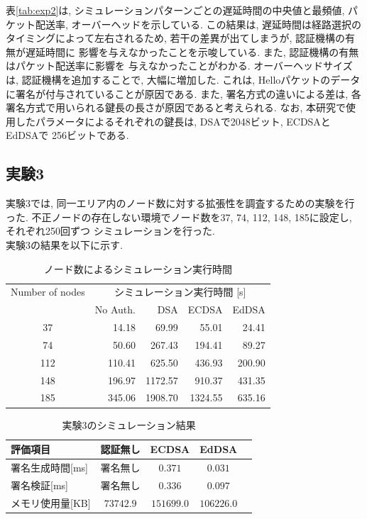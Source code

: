 \documentclass[a4j,9pt,twocolumn]{jsarticle}
\begin{document}
表\ref{tab:exp2}は, シミュレーションパターンごとの遅延時間の中央値と最頻値, 
パケット配送率, オーバーヘッドを示している. この結果は, 遅延時間は経路選択の
タイミングによって左右されるため, 若干の差異が出てしまうが, 認証機構の有無が遅延時間に
影響を与えなかったことを示唆している. また, 認証機構の有無はパケット配送率に影響を
与えなかったことがわかる. オーバーヘッドサイズは, 認証機構を追加することで,
大幅に増加した. これは, Helloパケットのデータに署名が付与されていることが原因である. 
また, 署名方式の違いによる差は, 各署名方式で用いられる鍵長の長さが原因であると考えられる. 
なお, 本研究で使用したパラメータによるそれぞれの鍵長は, DSAで2048ビット, ECDSAとEdDSAで
256ビットである. 

\subsection{実験3}
\indent 実験3では, 同一エリア内のノード数に対する拡張性を調査するための実験を行った. 
不正ノードの存在しない環境でノード数を37, 74, 112, 148, 185に設定し, それぞれ250回ずつ
シミュレーションを行った. \\
\indent 実験3の結果を以下に示す. 
\begin{table}[h]
    \centering
    \caption{ノード数によるシミュレーション実行時間}
    \label{tab:exp3_simtime}
    \begin{tabular}{c|rrrr} \hline
        Number of nodes & \multicolumn{4}{c}{シミュレーション実行時間 [s]} \\ \cline{2-5}
                       & No Auth. & DSA & ECDSA & EdDSA \\ \hline \hline
        37  &  14.18  &   69.99  &   55.01  &   24.41  \\
        74  &  50.60  &  267.43  &  194.41  &   89.27  \\
        112 & 110.41  &  625.50  &  436.93  &  200.90  \\
        148 & 196.97  & 1172.57  &  910.37  &  431.35  \\
        185 & 345.06  & 1908.70  & 1324.55  &  635.16  \\ \hline
    \end{tabular}
\end{table}
\vspace{-5mm}
\begin{table}[h]
    \centering
    \caption{実験3のシミュレーション結果}
    \label{tab:exp3_sig} 
    \begin{tabular}{lcccc} \hline
        評価項目 & 認証無し & ECDSA & EdDSA \\ \hline \hline
        署名生成時間[ms] & 署名無し & $0.371$ & $0.031$ \\
        署名検証[ms] & 署名無し & $0.336$ & $0.097$ \\
        メモリ使用量[KB] & $73742.9$ & $151699.0$ & $106226.0$ \\ \hline
    \end{tabular}
\end{table}
\end{document}

